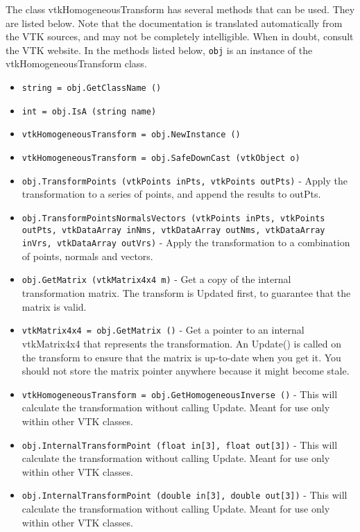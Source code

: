 The class vtkHomogeneousTransform has several methods that can be used.
  They are listed below.
Note that the documentation is translated automatically from the VTK sources,
and may not be completely intelligible.  When in doubt, consult the VTK website.
In the methods listed below, \verb|obj| is an instance of the vtkHomogeneousTransform class.
\begin{itemize}
\item  \verb|string = obj.GetClassName ()|

\item  \verb|int = obj.IsA (string name)|

\item  \verb|vtkHomogeneousTransform = obj.NewInstance ()|

\item  \verb|vtkHomogeneousTransform = obj.SafeDownCast (vtkObject o)|

\item  \verb|obj.TransformPoints (vtkPoints inPts, vtkPoints outPts)| -  Apply the transformation to a series of points, and append the
 results to outPts.  

\item  \verb|obj.TransformPointsNormalsVectors (vtkPoints inPts, vtkPoints outPts, vtkDataArray inNms, vtkDataArray outNms, vtkDataArray inVrs, vtkDataArray outVrs)| -  Apply the transformation to a combination of points, normals
 and vectors.  

\item  \verb|obj.GetMatrix (vtkMatrix4x4 m)| -  Get a copy of the internal transformation matrix.  The
 transform is Updated first, to guarantee that the matrix
 is valid.

\item  \verb|vtkMatrix4x4 = obj.GetMatrix ()| -  Get a pointer to an internal vtkMatrix4x4 that represents
 the transformation.  An Update() is called on the transform
 to ensure that the matrix is up-to-date when you get it.
 You should not store the matrix pointer anywhere because it
 might become stale.

\item  \verb|vtkHomogeneousTransform = obj.GetHomogeneousInverse ()| -  This will calculate the transformation without calling Update.
 Meant for use only within other VTK classes.

\item  \verb|obj.InternalTransformPoint (float in[3], float out[3])| -  This will calculate the transformation without calling Update.
 Meant for use only within other VTK classes.

\item  \verb|obj.InternalTransformPoint (double in[3], double out[3])| -  This will calculate the transformation without calling Update.
 Meant for use only within other VTK classes.

\end{itemize}
